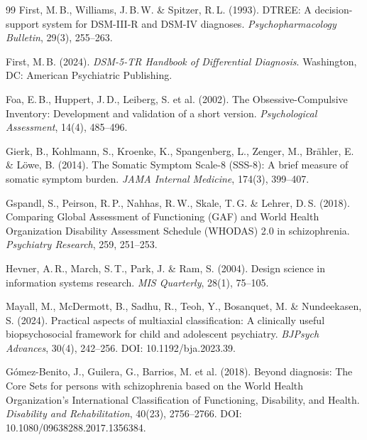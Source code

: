 \documentclass[11pt,a4paper]{article}
\begin{document}
\begin{thebibliography}{99}
First, M.\,B., Williams, J.\,B.\,W. \& Spitzer, R.\,L. (1993).
\newblock DTREE: A decision-support system for DSM-III-R and DSM-IV diagnoses.
\newblock \textit{Psychopharmacology Bulletin}, 29(3), 255--263.

First, M.\,B. (2024).
\newblock \textit{DSM-5-TR Handbook of Differential Diagnosis}.
\newblock Washington, DC: American Psychiatric Publishing.

Foa, E.\,B., Huppert, J.\,D., Leiberg, S. et al. (2002).
\newblock The Obsessive-Compulsive Inventory: Development and validation of a short version.
\newblock \textit{Psychological Assessment}, 14(4), 485--496.

Gierk, B., Kohlmann, S., Kroenke, K., Spangenberg, L., Zenger, M., Br\"ahler, E. \& L\"owe, B. (2014).
\newblock The Somatic Symptom Scale-8 (SSS-8): A brief measure of somatic symptom burden.
\newblock \textit{JAMA Internal Medicine}, 174(3), 399--407.

Gspandl, S., Peirson, R.\,P., Nahhas, R.\,W., Skale, T.\,G. \& Lehrer, D.\,S. (2018).
\newblock Comparing Global Assessment of Functioning (GAF) and World Health Organization Disability Assessment Schedule (WHODAS) 2.0 in schizophrenia.
\newblock \textit{Psychiatry Research}, 259, 251--253.

Hevner, A.\,R., March, S.\,T., Park, J. \& Ram, S. (2004).
\newblock Design science in information systems research.
\newblock \textit{MIS Quarterly}, 28(1), 75--105.

Mayall, M., McDermott, B., Sadhu, R., Teoh, Y., Bosanquet, M. \& Nundeekasen, S. (2024).
\newblock Practical aspects of multiaxial classification: A clinically useful biopsychosocial framework for child and adolescent psychiatry.
\newblock \textit{BJPsych Advances}, 30(4), 242--256. DOI: 10.1192/bja.2023.39.

G{\'o}mez-Benito, J., Guilera, G., Barrios, M. et al. (2018).
\newblock Beyond diagnosis: The Core Sets for persons with schizophrenia based on the World Health Organization's International Classification of Functioning, Disability, and Health.
\newblock \textit{Disability and Rehabilitation}, 40(23), 2756--2766. DOI: 10.1080/09638288.2017.1356384.


\end{thebibliography}
\end{document}
